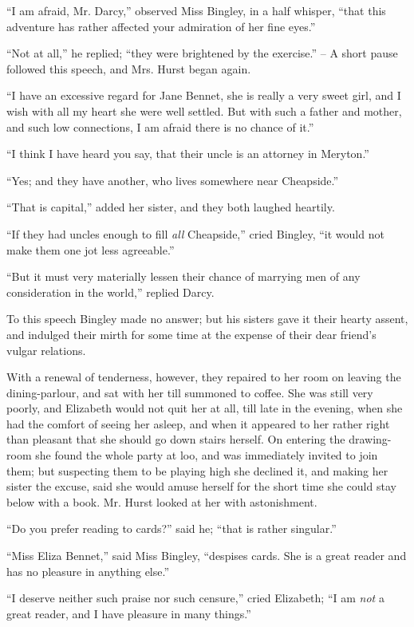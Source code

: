 “I am afraid, Mr. Darcy,” observed Miss Bingley, in
a half whisper, “that this adventure has rather affected
your admiration of her fine eyes.”

“Not at all,” he replied; “they were brightened by
the exercise.” -- A short pause followed this speech, and
Mrs. Hurst began again.

“I have an excessive regard for Jane Bennet, she is
really a very sweet girl, and I wish with all my heart she
were well settled. But with such a father and mother, and
such low connections, I am afraid there is no chance of it.”

“I think I have heard you say, that their uncle is an
attorney in Meryton.”

“Yes; and they have another, who lives somewhere
near Cheapside.”

“That is capital,” added her sister, and they both
laughed heartily.

“If they had uncles enough to fill \textit{all} Cheapside,” cried
Bingley, “it would not make them one jot less agreeable.”

“But it must very materially lessen their chance of
marrying men of any consideration in the world,” replied
Darcy.

To this speech Bingley made no answer; but his sisters
gave it their hearty assent, and indulged their mirth for
some time at the expense of their dear friend’s vulgar
relations.

With a renewal of tenderness, however, they repaired
to her room on leaving the dining-parlour, and sat with
her till summoned to coffee. She was still very poorly,
and Elizabeth would not quit her at all, till late in the
evening, when she had the comfort of seeing her asleep,
and when it appeared to her rather right than pleasant
that she should go down stairs herself. On entering the
drawing-room she found the whole party at loo, and was
immediately invited to join them; but suspecting them
to be playing high she declined it, and making her sister
the excuse, said she would amuse herself for the short
time she could stay below with a book. Mr. Hurst looked
at her with astonishment.

“Do you prefer reading to cards?” said he; “that
is rather singular.”

“Miss Eliza Bennet,” said Miss Bingley, “despises cards.
She is a great reader and has no pleasure in anything else.”

“I deserve neither such praise nor such censure,” cried
Elizabeth; “I am \textit{not} a great reader, and I have pleasure
in many things.”

